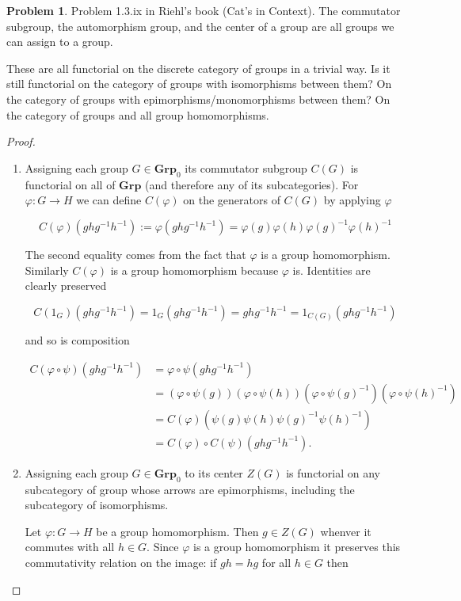 \documentclass[11pt]{amsart}
\theoremstyle{plain}
\theoremstyle{definition}
\newtheorem{prob}{Problem}
\newcommand{\Grp}{\mathbf{Grp}}
\newcommand{\noi}{{\noindent}}
\begin{document}
\begin{prob}
Problem 1.3.ix in Riehl's book (Cat's in Context). The commutator subgroup, the automorphism group, and the center of a group are all groups we can assign to a group. \medskip

These are all functorial on the discrete category of groups in a trivial way. Is it still functorial on the category of groups with isomorphisms between them? On the category of groups with epimorphisms/monomorphisms between them? On the category of groups and all group homomorphisms. 
\end{prob}
\begin{proof}\
\begin{enumerate}[label=(\alph*)]
\item Assigning each group $G \in \Grp_0$ its commutator subgroup $C(G)$ is functorial on all of $\Grp$ (and therefore any of its subcategories). For $\varphi : G \to H$ we can define $C(\varphi)$ on the generators of $C(G)$ by applying $\varphi$

\[ 
C(\varphi)(ghg^{-1}h^{-1}) 
:= \varphi(ghg^{-1}h^{-1}) 
= \varphi(g) \varphi(h) \varphi(g)^{-1} \varphi(h)^{-1} 
\]

\noi The second equality comes from the fact that $\varphi$ is a group homomorphism. Similarly $C(\varphi)$ is a group homomorphism because $\varphi$ is. Identities are clearly preserved


\[ C(1_G)(ghg^{-1}h^{-1}) = 1_G(ghg^{-1}h^{-1}) =ghg^{-1}h^{-1} = 1_{C(G)} (ghg^{-1}h^{-1})\]

\noi and so is composition 

\begin{align*} 
C(\varphi \circ \psi) (ghg^{-1}h^{-1}) 
&= \varphi \circ \psi (ghg^{-1}h^{-1}) \\
&=  (\varphi \circ \psi (g)) (\varphi \circ \psi(h)) (\varphi \circ \psi(g)^{-1})(\varphi \circ \psi(h)^{-1})\\ 
&= C(\varphi) \left(\psi (g) \psi(h) \psi(g)^{-1} \psi(h)^{-1} \right)\\ 
&= C(\varphi) \circ C(\psi) ( ghg^{-1}h^{-1}).
\end{align*}\bigskip

\item Assigning each group $G \in \Grp_0$ to its center $Z(G)$ is functorial on any subcategory of group whose arrows are epimorphisms, including the subcategory of isomorphisms.  \bigskip 

Let $\varphi : G \to H$ be a group homomorphism. Then $g \in Z(G)$ whenver it commutes with all $h \in G$. Since $\varphi$ is a group homomorphism it preserves this commutativity relation on the image: if $gh = hg$ for all $h \in G$ then 


\end{enumerate}
\end{proof}
\end{document}
